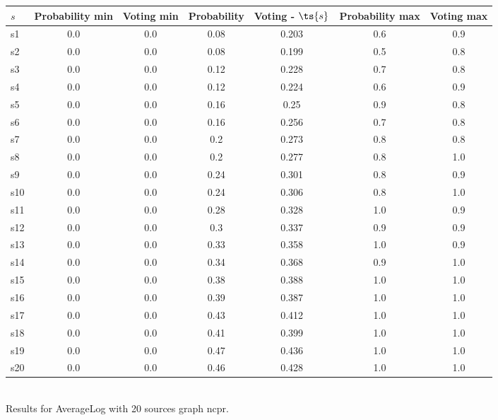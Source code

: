 \documentclass{article}
\begin{document}
\noindent\begin{tabular}{|l|c|c|c|c|c|c|}
\hline
$s$& Probability min & Voting min & Probability & Voting - $\ts{s}$ & Probability max & Voting max\\
\hline
s1 &0.0 & 0.0 & 0.08 & 0.203 & 0.6 & 0.9\\
\hline
s2 &0.0 & 0.0 & 0.08 & 0.199 & 0.5 & 0.8\\
\hline
s3 &0.0 & 0.0 & 0.12 & 0.228 & 0.7 & 0.8\\
\hline
s4 &0.0 & 0.0 & 0.12 & 0.224 & 0.6 & 0.9\\
\hline
s5 &0.0 & 0.0 & 0.16 & 0.25 & 0.9 & 0.8\\
\hline
s6 &0.0 & 0.0 & 0.16 & 0.256 & 0.7 & 0.8\\
\hline
s7 &0.0 & 0.0 & 0.2 & 0.273 & 0.8 & 0.8\\
\hline
s8 &0.0 & 0.0 & 0.2 & 0.277 & 0.8 & 1.0\\
\hline
s9 &0.0 & 0.0 & 0.24 & 0.301 & 0.8 & 0.9\\
\hline
s10 &0.0 & 0.0 & 0.24 & 0.306 & 0.8 & 1.0\\
\hline
s11 &0.0 & 0.0 & 0.28 & 0.328 & 1.0 & 0.9\\
\hline
s12 &0.0 & 0.0 & 0.3 & 0.337 & 0.9 & 0.9\\
\hline
s13 &0.0 & 0.0 & 0.33 & 0.358 & 1.0 & 0.9\\
\hline
s14 &0.0 & 0.0 & 0.34 & 0.368 & 0.9 & 1.0\\
\hline
s15 &0.0 & 0.0 & 0.38 & 0.388 & 1.0 & 1.0\\
\hline
s16 &0.0 & 0.0 & 0.39 & 0.387 & 1.0 & 1.0\\
\hline
s17 &0.0 & 0.0 & 0.43 & 0.412 & 1.0 & 1.0\\
\hline
s18 &0.0 & 0.0 & 0.41 & 0.399 & 1.0 & 1.0\\
\hline
s19 &0.0 & 0.0 & 0.47 & 0.436 & 1.0 & 1.0\\
\hline
s20 &0.0 & 0.0 & 0.46 & 0.428 & 1.0 & 1.0\\
\hline
\end{tabular}\\

\noindent Results for AverageLog with 20 sources graph ncpr.
\end{document}
